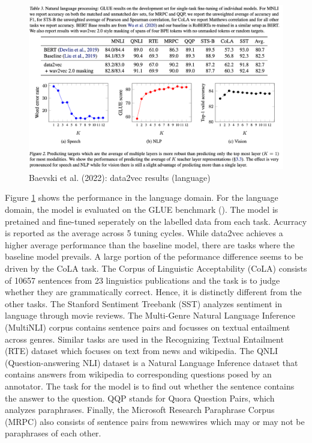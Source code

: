 \documentclass[
]{krantz}
\begin{document}
\begin{figure}

{\centering \includegraphics[width=1\linewidth]{figures/05-chapter2/datavecresultstwo} 

}

\caption{Baevski et al. (2022): data2vec results (language)}\label{fig:data2vecresults2}
\end{figure}

Figure \ref{fig:data2vecresults2} shows the performance in the language domain.
For the language domain, the model is evaluated on the GLUE benchmark (\citet{wang2018glue}).
The model is pretained and fine-tuned seperately on the labelled data from each task. Acurracy
is reported as the average across 5 tuning cycles. While data2vec achieves a higher average performance than the baseline model, there are tasks
where the baseline model prevails. A large portion of the peformance difference seems to be driven
by the CoLA task. The Corpus of Linguistic Acceptability (CoLA) consists of 10657 sentences from 23 linguistics publications and the task is to judge whether they are grammatically correct. Hence, it is distinctly different from the other tasks. The Stanford Sentiment Treebank (SST) analyzes sentiment in language through movie reviews. The Multi-Genre Natural Language Inference (MultiNLI) corpus contains sentence pairs and focusses on
textual entailment across genres. Similar tasks are used in the Recognizing Textual Entailment (RTE) dataset which focuses on text from news and wikipedia. The QNLI (Question-answering NLI) dataset is a Natural Language Inference dataset that contains answers from wikipedia to corresponding questions posed by an annotator. The task for the model is to find out whether the sentence contains the answer to the question. QQP stands for Quora Question Pairs, which analyzes paraphrases. Finally, the Microsoft Research Paraphrase Corpus (MRPC) also consists of sentence pairs from newswires which may or may not be paraphrases of each other.
\end{document}
